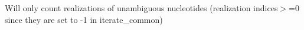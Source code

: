 
\begin{DoxyRefList}
\item[\label{bug__bug000002}%
\Hypertarget{bug__bug000002}%
Member \hyperlink{classDinucl__markov_a63fd37e31c3e32fee54dc26146bc3fac}{Dinucl\+\_\+markov\+:\+:add\+\_\+to\+\_\+marginals} (long double, Marginal\+\_\+array\+\_\+p \&) const]Will only count realizations of unambiguous nucleotides (realization indices$>$=0 since they are set to -\/1 in iterate\+\_\+common) 
\end{DoxyRefList}